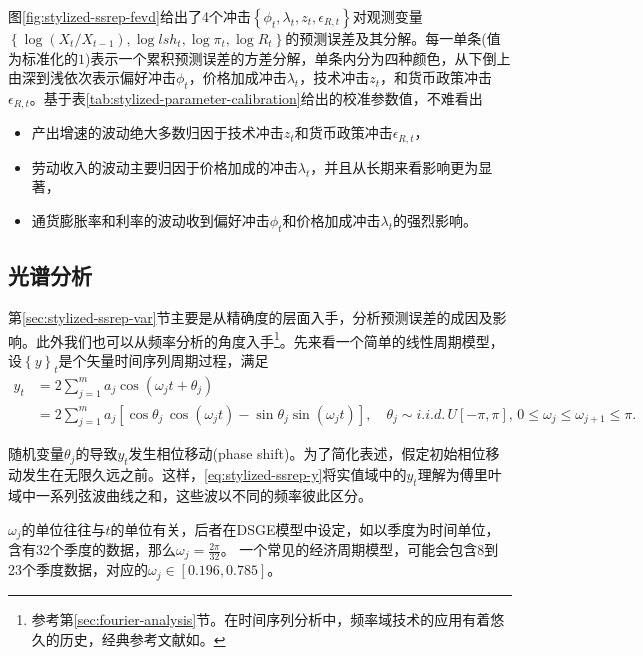 图\ref{fig:stylized-ssrep-fevd}给出了4个冲击$\left\{ \phi_{t}, \lambda_{t}, z_{t}, \epsilon_{R,t} \right\}$对观测变量$\left\{ \log \left( X_{t}/X_{t-1} \right), \log lsh_{t}, \log \pi_{t}, \log R_{t} \right\}$的预测误差及其分解。每一单条(值为标准化的$1$)表示一个累积预测误差的方差分解，单条内分为四种颜色，从下倒上由深到浅依次表示偏好冲击$\phi_{t}$，价格加成冲击$\lambda_{t}$，技术冲击$z_{t}$，和货币政策冲击$\epsilon_{R,t}$。基于表\ref{tab:stylized-parameter-calibration}给出的校准参数值，不难看出
\begin{itemize}
  \item 产出增速的波动绝大多数归因于技术冲击$z_{t}$和货币政策冲击$\epsilon_{R,t}$，
  \item 劳动收入的波动主要归因于价格加成的冲击$\lambda_{t}$，并且从长期来看影响更为显著，
  \item 通货膨胀率和利率的波动收到偏好冲击$\phi_{t}$和价格加成冲击$\lambda_{t}$的强烈影响。
\end{itemize}


\subsection{光谱分析}
\label{sec:stylized-ssrep-spectral}

第\ref{sec:stylized-ssrep-var}节主要是从精确度的层面入手，分析预测误差的成因及影响。此外我们也可以从频率分析的角度入手\footnote{参考第\ref{sec:fourier-analysis}节。在时间序列分析中，频率域技术的应用有着悠久的历史，经典参考文献如\citep{Koopmans:1995vn, Diebold:2010ei}。}。先来看一个简单的线性周期模型，设$\left\{ y \right\}_{t}$是个矢量时间序列周期过程，满足
\begin{equation}
  \label{eq:stylized-ssrep-y}
\begin{split}
  y_{t} & = 2 \sum_{j=1}^{m} a_{j} \cos \left( \omega_{j} t + \theta_{j} \right) \\
  & = 2 \sum_{j=1}^{m} a_{j}
  \left[
  \cos \theta_{j} \, \cos \left( \omega_{j} t \right)
  - \sin \theta_{j} \sin \left( \omega_{j} t \right)
  \right], \quad \theta_{j} \sim i.i.d. \, U[-\pi, \pi], \, 0 \le \omega_{j} \le \omega_{j+1} \le \pi.
\end{split}
\end{equation}

随机变量$\theta_{j}$的导致$y_{t}$发生相位移动(phase shift)。为了简化表述，假定初始相位移动发生在无限久远之前。这样，\eqref{eq:stylized-ssrep-y}将实值域中的$y_{t}$理解为傅里叶域中一系列弦波曲线之和，这些波以不同的频率彼此区分。

$\omega_{j}$的单位往往与$t$的单位有关，后者在DSGE模型中设定，如以季度为时间单位，含有32个季度的数据，那么$\omega_{j} = \frac{2 \pi}{32}$。
一个常见的经济周期模型，可能会包含8到23个季度数据，对应的$\omega_{j} \in \left[ 0.196, 0.785 \right]$。

